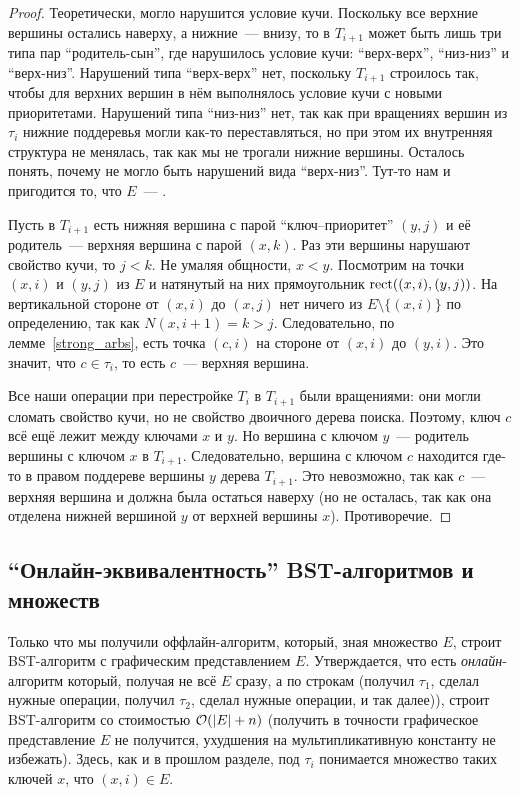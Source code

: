 \begin{proof}
	Теоретически, могло нарушится условие кучи. Поскольку все верхние вершины остались наверху, а нижние~--- внизу, то в $T_{i+1}$ может быть лишь три типа пар ``родитель-сын'', где нарушилось условие кучи: ``верх-верх'', ``низ-низ'' и ``верх-низ''. Нарушений типа ``верх-верх''
	нет, поскольку $T_{i+1}$ строилось так, чтобы для верхних вершин в нём выполнялось условие кучи с новыми приоритетами. Нарушений типа ``низ-низ'' нет, так как при вращениях вершин из $\tau_i$ нижние поддеревья могли как-то переставляться, но при этом их внутренняя структура не менялась, так как мы не трогали нижние вершины. Осталось понять, почему не могло быть нарушений вида ``верх-низ''. Тут-то нам и пригодится то, что $E$~--- \arbs.

	Пусть в $T_{i+1}$ есть нижняя вершина с парой ``ключ--приоритет'' $(y, j)$ и её родитель~--- верхняя вершина с парой $(x, k)$. Раз эти вершины нарушают свойство кучи, то $j < k$.
	Не умаляя общности, $x < y$. Посмотрим на точки $(x, i)$ и $(y, j)$ из $E$ и натянутый на них прямоугольник $\operatorname{rect}((x, i), (y, j))$. На вертикальной стороне от $(x, i)$ до $(x, j)$ нет ничего из $E \setminus \{(x, i) \}$ по определению, так как $N(x, i + 1) = k > j$. Следовательно, по лемме~\ref{strong_arbs}, есть точка $(c, i)$ на
	стороне от $(x, i)$ до $(y, i)$. Это значит, что $c \in \tau_i$, то есть $c$~--- верхняя вершина.

	Все наши операции при перестройке $T_i$ в $T_{i+1}$ были вращениями: они могли сломать свойство кучи, но не свойство двоичного дерева поиска. Поэтому, ключ $c$ всё ещё лежит между ключами $x$ и $y$. Но вершина с ключом $y$~--- родитель вершины с ключом $x$ в $T_{i+1}$. Следовательно, вершина с ключом $c$ находится где-то в правом поддереве вершины $y$ дерева $T_{i + 1}$. Это невозможно, так как $c$~--- верхняя вершина и должна была остаться наверху (но не осталась, так как она отделена нижней вершиной $y$ от верхней вершины $x$). Противоречие.
\end{proof}

\subsection{``Онлайн-эквивалентность'' BST-алгоритмов и \arbs множеств}

Только что мы получили оффлайн-алгоритм, который, зная \arbs множество $E$, строит BST-алгоритм с графическим представлением $E$. Утверждается, что есть \emph{онлайн}-алгоритм который, получая не всё $E$ сразу, а по строкам (получил $\tau_1$, сделал нужные операции, получил $\tau_2$, сделал нужные операции, и так далее)), строит BST-алгоритм со стоимостью $\mathcal{O}(\lvert E\rvert + n)$
(получить в точности графическое представление $E$ не получится, ухудшения на мультипликативную константу не избежать). Здесь, как и в прошлом разделе, под $\tau_i$
понимается множество таких ключей $x$, что $(x, i) \in E$.

